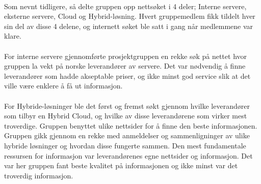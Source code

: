\paragraph{} Som nevnt tidligere, så delte gruppen  opp nettsøket i 4 deler; Interne servere, eksterne servere, Cloud og Hybrid-løsning. Hvert gruppemedlem fikk tildelt hver sin del av disse 4 delene, og internett søket ble satt i gang når medlemmene var klare.

\paragraph{} For interne servere gjennomførte prosjektgruppen en rekke søk på nettet hvor gruppen la vekt på norske leverandører av servere. Det var nødvendig å finne leverandører som hadde akseptable priser, og ikke minst god service slik at det ville være enklere å få ut informasjon.

\paragraph{} For Hybride-løsninger ble det først og fremst søkt gjennom hvilke leverandører som tilbyr en Hybrid Cloud, og hvilke av disse leverandørene som virker mest troverdige. Gruppen benyttet ulike nettsider for å finne den beste informasjonen. Gruppen gikk gjennom en rekke med anmeldelser og sammenligninger av ulike hybride løsninger og hvordan disse fungerte sammen. Den mest fundamentale ressursen for informasjon var leverandørenes egne nettsider og informasjon. Det var her gruppen fant beste kvalitet på informasjonen og ikke minst var det troverdig informasjon. 


